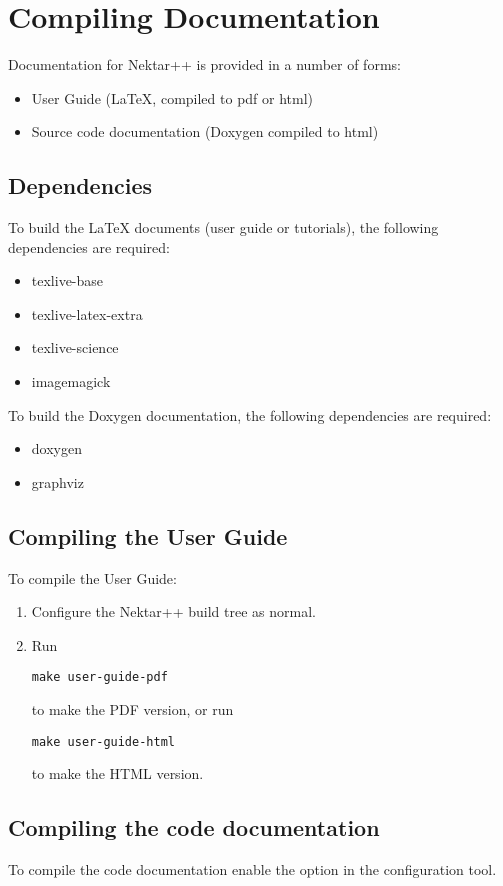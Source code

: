 \section{Compiling Documentation}
Documentation for Nektar++ is provided in a number of forms:
\begin{itemize}
\item User Guide (LaTeX, compiled to pdf or html)
\item Source code documentation (Doxygen compiled to html)
\end{itemize}

\subsection{Dependencies}
To build the LaTeX documents (user guide or tutorials), the following
dependencies are required:
\begin{itemize}
\item texlive-base
\item texlive-latex-extra
\item texlive-science
\item imagemagick
\end{itemize}

To build the Doxygen documentation, the following dependencies are required:
\begin{itemize}
\item doxygen
\item graphviz
\end{itemize}

\subsection{Compiling the User Guide}
To compile the User Guide:
\begin{enumerate}
\item Configure the Nektar++ build tree as normal.
\item Run
    \begin{lstlisting}[style=BashInputStyle]
make user-guide-pdf
\end{lstlisting}
to make the PDF version, or run
\begin{lstlisting}[style=BashInputStyle]
make user-guide-html
\end{lstlisting}
to make the HTML version.
\end{enumerate}

\subsection{Compiling the code documentation}
To compile the code documentation enable the  option
in the  configuration tool.

